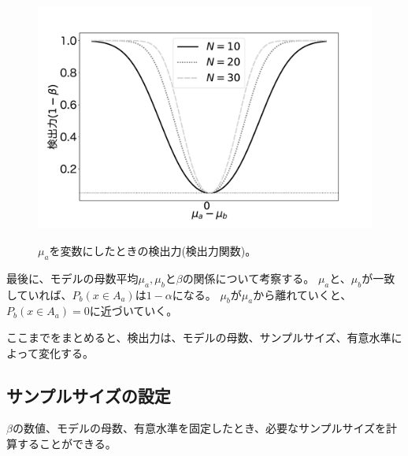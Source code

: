 \begin{figure}
    \begin{center}
        \includegraphics[width=15cm]{./image/04_/power_of_test.pdf}
        \label{fig:power_of_test_N_mu0_variable}
        \caption{$\mu_a$を変数にしたときの検出力(検出力関数)。}
    \end{center}
\end{figure}



最後に、モデルの母数平均$\mu_a,\mu_b$と$\beta$の関係について考察する。
$\mu_a$と、$\mu_b$が一致していれば、$P_b(x \in A_a )$は$1-\alpha$になる。
$\mu_b$が$\mu_a$から離れていくと、$P_b(x \in A_a)=0$に近づいていく。

ここまでをまとめると、検出力は、モデルの母数、サンプルサイズ、有意水準によって変化する。


\subsection{サンプルサイズの設定}
$\beta$の数値、モデルの母数、有意水準を固定したとき、必要なサンプルサイズを計算することができる。%




